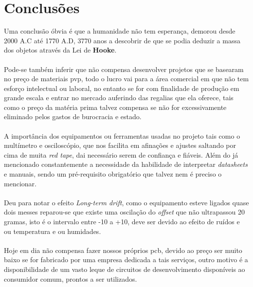 \chapter{Conclusões}
Uma conclusão óbvia é que a humanidade não tem esperança, demorou desde 2000 A.C até 1770 A.D, 3770 anos a descobrir de que se podia deduzir a massa dos objetos através da Lei de \textbf{Hooke}.
\\
\\
Pode-se também inferir que não compensa desenvolver projetos que se basearam no preço de materiais \ac{pvp}, todo o lucro vai para a área comercial em que não tem esforço intelectual ou laboral, no entanto se for com finalidade de produção em grande escala e entrar no mercado auferindo das regalias que ela oferece, tais como o preço da matéria prima talvez compensa se não for excessivamente eliminado pelos gastos de burocracia e estado.
\\
\\
A importância dos equipamentos ou ferramentas usadas no projeto tais como o multímetro e osciloscópio, que nos facilita em afinações e ajustes saltando por cima de muita \textit{red tape}, dai necessário serem de confiança e fiáveis. Além do já mencionado constantemente a necessidade da habilidade de interpretar \textit{datasheets} e manuais, sendo um pré-requisito obrigatório que talvez nem é preciso o mencionar.
\\
\\
Deu para notar o efeito \textit{Long-term drift}, como o equipamento esteve ligados quase dois messes reparou-se que existe uma oscilação do \textit{offset} que não ultrapassou 20 gramas, isto é o intervalo entre -10 a +10, deve ser devido ao efeito de ruídos e ou temperatura e ou humidades.
\\
\\
Hoje em dia não compensa fazer nossos próprios \ac{pcb}, devido ao preço ser muito baixo se for fabricado por uma empresa dedicada a tais serviços, outro motivo é a disponibilidade  de um vasto leque de circuitos de desenvolvimento disponíveis ao consumidor comum, prontos a ser utilizados.
